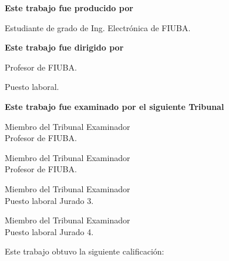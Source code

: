 \begin{titlepage}
\begin{large}
\begin{flushleft}
	\textbf{Este trabajo fue producido por}
\end{flushleft}

\signature{(Nombre del autor de tesis)}{Estudiante de grado de Ing. Electrónica de FIUBA.}

\begin{flushleft}
	\textbf{Este trabajo fue dirigido por}
\end{flushleft}

\signature{(Nombre del director de tesis)}{Profesor de FIUBA.}
\signature{(Nombre del co-director de tesis)}{Puesto laboral.}

\begin{flushleft}
	\textbf{Este trabajo fue examinado por el siguiente Tribunal}
\end{flushleft}

\signature{(Nombre de Jurado 1)}{Miembro del Tribunal Examinador \\ Profesor de FIUBA.}

\signature{(Nombre de Jurado 2)}{Miembro del Tribunal Examinador \\ Profesor de FIUBA.}

\signature{(Nombre de Jurado 3)}{Miembro del Tribunal Examinador \\ Puesto laboral Jurado 3.}

\signature{(Nombre de Jurado 4)}{Miembro del Tribunal Examinador \\ Puesto laboral Jurado 4.}

Este trabajo obtuvo la siguiente calificación:

\signature{}{}
\end{large}
\end{titlepage}
